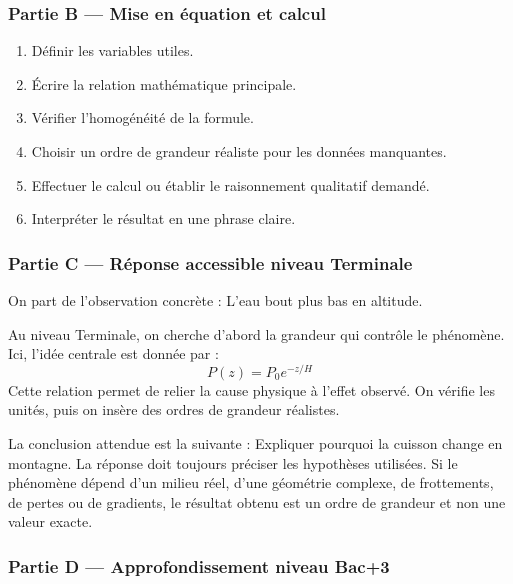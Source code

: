\documentclass[11pt,a4paper]{article}
\begin{document}
\subsubsection*{Partie B — Mise en équation et calcul}

\begin{enumerate}
  \item Définir les variables utiles.
  \item Écrire la relation mathématique principale.
  \item Vérifier l'homogénéité de la formule.
  \item Choisir un ordre de grandeur réaliste pour les données manquantes.
  \item Effectuer le calcul ou établir le raisonnement qualitatif demandé.
  \item Interpréter le résultat en une phrase claire.
\end{enumerate}

\subsubsection*{Partie C — Réponse accessible niveau Terminale}

\begin{corrigebox}
On part de l'observation concrète : L'eau bout plus bas en altitude.

Au niveau Terminale, on cherche d'abord la grandeur qui contrôle le phénomène. Ici, l'idée centrale est donnée par :
\[
P(z)=P_0e^{-z/H}
\]
Cette relation permet de relier la cause physique à l'effet observé. On vérifie les unités, puis on insère des ordres de grandeur réalistes.

La conclusion attendue est la suivante : Expliquer pourquoi la cuisson change en montagne. La réponse doit toujours préciser les hypothèses utilisées. Si le phénomène dépend d'un milieu réel, d'une géométrie complexe, de frottements, de pertes ou de gradients, le résultat obtenu est un ordre de grandeur et non une valeur exacte.
\end{corrigebox}

\subsubsection*{Partie D — Approfondissement niveau Bac+3}
\end{document}
